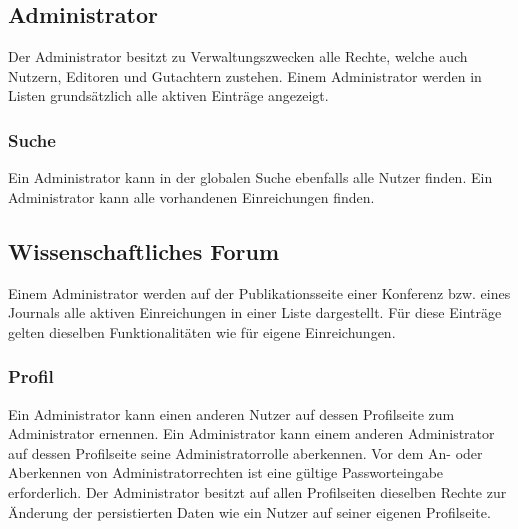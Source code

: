 \subsection{Administrator}
Der Administrator besitzt zu Verwaltungszwecken alle Rechte, welche auch Nutzern, Editoren
und Gutachtern zustehen. %
Einem Administrator werden in Listen grundsätzlich alle aktiven Einträge angezeigt.
\subsubsection{Suche}
\begin{description}
    \XXitem{} Ein Administrator kann in der globalen Suche ebenfalls alle Nutzer finden.
    \XXitem{} Ein Administrator kann alle vorhandenen Einreichungen finden.
\end{description}

\subsection{Wissenschaftliches Forum}
\begin{description}
    \XXitem{} Einem Administrator werden auf der Publikationsseite einer Konferenz bzw. eines Journals
    alle aktiven Einreichungen in einer Liste dargestellt.
    Für diese Einträge gelten dieselben Funktionalitäten wie für eigene Einreichungen. %
    \XXitem{}
\end{description}

\subsubsection{Profil}
\begin{description}
    \XXitem{} Ein Administrator kann einen anderen Nutzer auf dessen Profilseite zum Administrator ernennen.
    \XXitem{} Ein Administrator kann einem anderen Administrator auf dessen Profilseite seine
    Administratorrolle aberkennen.
     Vor dem An- oder Aberkennen von Administratorrechten ist eine gültige
    Passworteingabe erforderlich.
    \XXitem{} Der Administrator besitzt auf allen Profilseiten dieselben Rechte zur Änderung
    der persistierten Daten wie ein Nutzer auf seiner eigenen Profilseite. %
\end{description}

